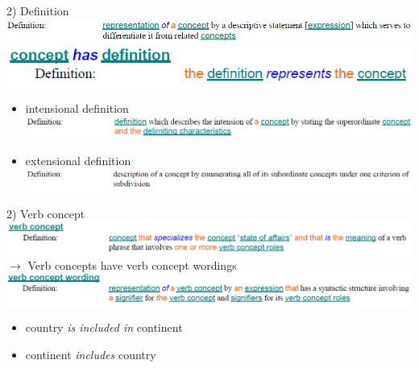 \documentclass[t,12pt,english
\ifx\beamermode\undefined\else,\beamermode\fi
]{beamer}
\begin{document}
\begin{frame}{2) Definition}
	\includegraphics[width=\linewidth]{assets/definition}
	\vspace*{0.35cm}
	\includegraphics[width=0.65\linewidth]{assets/conceptHasDefinition}
	
	
	
	\begin{itemize}
		\item intensional definition
		\includegraphics[width=\linewidth]{assets/intensionalDefinition}
		\item extensional definition
		\includegraphics[width=\linewidth]{assets/extensionalDefinition}
	\end{itemize}
\end{frame}

\begin{frame}{2) Verb concept}
	\includegraphics[width=\linewidth]{assets/verbConcept} \\
	$ \rightarrow $ Verb concepts have verb concept wordings \\
	\vspace{0.2cm}
	\includegraphics[width=\linewidth]{assets/verbConceptWording}
	
	\begin{example}
		\begin{itemize}
			\item country \textit{is included in} continent
			\item continent \textit{includes} country
		\end{itemize}
	\end{example}
\end{frame}
\end{document}
